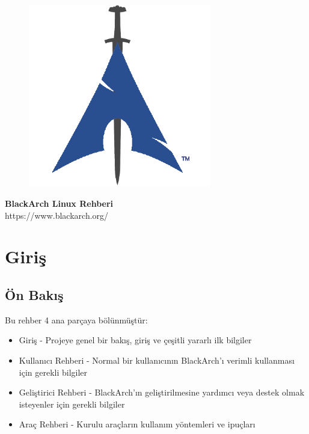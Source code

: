 \documentclass[a4paper, oneside, 11pt]{book}
\begin{document}
\pagestyle{empty}
\begin{center}
\begin{figure}[htbp]
\centering
\vspace{0.5cm}
\includegraphics[width=8cm]{images/logo.png}
\label{fig:logo}
\end{figure}
\vspace{0.5cm}
\Huge{\textbf{BlackArch Linux Rehberi}}\\
\vspace{1cm}
\Large{\color{blue}https://www.blackarch.org/}\\
\vspace{0.5cm}
\end{center}
\newpage
\tableofcontents
\newpage
\pagestyle{fancy}


\chapter{Giriş}

\section{Ön Bakış}
Bu rehber 4 ana parçaya bölünmüştür:
\begin{itemize}
\item Giriş - Projeye genel bir bakış, giriş ve çeşitli yararlı ilk bilgiler
\item Kullanıcı Rehberi - Normal bir kullanıcının BlackArch'ı verimli kullanması için gerekli bilgiler
\item Geliştirici Rehberi - BlackArch'ın geliştirilmesine yardımcı veya destek olmak isteyenler için gerekli bilgiler
\item Araç Rehberi - Kurulu araçların kullanım yöntemleri ve ipuçları
\end{itemize}
\end{document}
